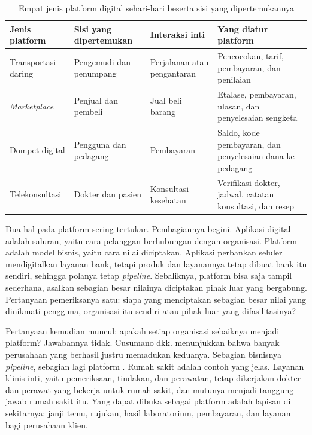 \begin{table}[!htb]
  \centering
  \caption{Empat jenis platform digital sehari-hari beserta sisi yang
           dipertemukannya}
  \label{tab:ch01-contoh-platform}
  \begin{tabularx}{\textwidth}{>{\raggedright\arraybackslash}p{2.3cm}
                               >{\raggedright\arraybackslash}p{2.4cm}
                               >{\raggedright\arraybackslash}p{2.3cm}
                               >{\raggedright\arraybackslash}X}
    \hline
    \textbf{Jenis platform} & \textbf{Sisi yang dipertemukan} & \textbf{Interaksi inti} & \textbf{Yang diatur platform} \\
    \hline
    Transportasi daring & Pengemudi dan penumpang & Perjalanan atau pengantaran & Pencocokan, tarif, pembayaran, dan penilaian \\
    \hline
    \textit{Marketplace} & Penjual dan pembeli & Jual beli barang & Etalase, pembayaran, ulasan, dan penyelesaian sengketa \\
    \hline
    Dompet digital & Pengguna dan pedagang & Pembayaran & Saldo, kode pembayaran, dan penyelesaian dana ke pedagang \\
    \hline
    Telekonsultasi & Dokter dan pasien & Konsultasi kesehatan & Verifikasi dokter, jadwal, catatan konsultasi, dan resep \\
    \hline
  \end{tabularx}
\end{table}

Dua hal pada platform sering tertukar. Pembagiannya begini. Aplikasi digital
adalah saluran, yaitu cara pelanggan berhubungan dengan organisasi. Platform
adalah model bisnis, yaitu cara nilai diciptakan. Aplikasi perbankan seluler
mendigitalkan layanan bank, tetapi produk dan layanannya tetap dibuat bank itu
sendiri, sehingga polanya tetap \textit{pipeline}. Sebaliknya, platform bisa saja
tampil sederhana, asalkan sebagian besar nilainya diciptakan pihak luar yang
bergabung. Pertanyaan pemeriksanya satu: siapa yang menciptakan sebagian besar
nilai yang dinikmati pengguna, organisasi itu sendiri atau pihak luar yang
difasilitasinya?

Pertanyaan kemudian muncul: apakah setiap organisasi sebaiknya menjadi platform?
Jawabannya tidak. Cusumano dkk. menunjukkan bahwa banyak perusahaan yang berhasil
justru memadukan keduanya. Sebagian bisnisnya \textit{pipeline}, sebagian lagi
platform \cite{cusumano2019business}. Rumah sakit adalah contoh yang jelas.
Layanan klinis inti, yaitu pemeriksaan, tindakan, dan perawatan, tetap dikerjakan
dokter dan perawat yang bekerja untuk rumah sakit, dan mutunya menjadi tanggung
jawab rumah sakit itu. Yang dapat dibuka sebagai platform adalah lapisan di
sekitarnya: janji temu, rujukan, hasil laboratorium, pembayaran, dan layanan bagi
perusahaan klien.

